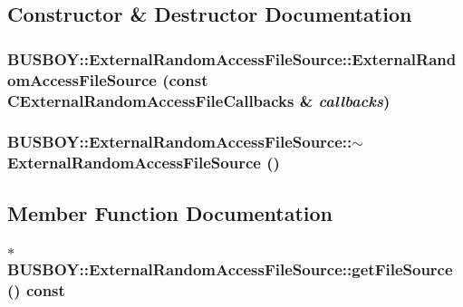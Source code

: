 \subsection{Constructor \& Destructor Documentation}
\hypertarget{classBUSBOY_1_1ExternalRandomAccessFileSource_a599a29722158a180e5cef4459740dde3}{
\subsubsection[{ExternalRandomAccessFileSource}]{\setlength{\rightskip}{0pt plus 5cm}BUSBOY::ExternalRandomAccessFileSource::ExternalRandomAccessFileSource (const {\bf CExternalRandomAccessFileCallbacks} \& {\em callbacks})}}
\label{classBUSBOY_1_1ExternalRandomAccessFileSource_a599a29722158a180e5cef4459740dde3}
\hypertarget{classBUSBOY_1_1ExternalRandomAccessFileSource_a5ca3071047373e1d09f4d7162477d54b}{
\subsubsection[{$\sim$ExternalRandomAccessFileSource}]{\setlength{\rightskip}{0pt plus 5cm}BUSBOY::ExternalRandomAccessFileSource::$\sim$ExternalRandomAccessFileSource ()}}
\label{classBUSBOY_1_1ExternalRandomAccessFileSource_a5ca3071047373e1d09f4d7162477d54b}


\subsection{Member Function Documentation}
\hypertarget{classBUSBOY_1_1ExternalRandomAccessFileSource_a188851337801b1a9cb7c36a02273f638}{
\subsubsection[{getFileSource}]{ $\ast$ BUSBOY::ExternalRandomAccessFileSource::getFileSource () const}}
\label{classBUSBOY_1_1ExternalRandomAccessFileSource_a188851337801b1a9cb7c36a02273f638}


